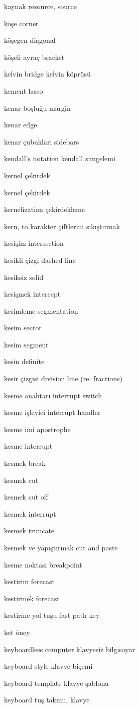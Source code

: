 \documentclass[12pt,fleqn]{article}\usepackage{../../common}
\begin{document}
kaynak resource, source

köşe corner

köşegen diagonal

köşeli ayraç bracket

kelvin bridge kelvin köprüsü

kement lasso

kenar boşluğu margin

kenar edge

kenar çubukları sidebars

kendall's notation kendall simgelemi

kernel çekirdek

kernel çekirdek

kernelization çekirdekleme

kern, to karakter çiftlerini sıkıştırmak

kesişim intersection

kesikli çizgi dashed line

kesiksiz solid

kesişmek intercept

kesimleme segmentation

kesim sector

kesim segment

kesin definite

kesir çizgisi division line (re: fractions)

kesme anahtarı interrupt switch

kesme işleyici interrupt handler

kesme imi apostrophe

kesme interrupt

kesmek break

kesmek cut

kesmek cut off

kesmek interrupt

kesmek truncate

kesmek ve yapıştırmak cut and paste

kesme noktası breakpoint

kestirim forecast

kestirmek forecast

kestirme yol tuşu fast path key

ket öney

keyboardless computer klavyesiz bilgisayar

keyboard style klavye biçemi

keyboard template klavye şablonu

keyboard tuş takımı, klavye
\end{document}
